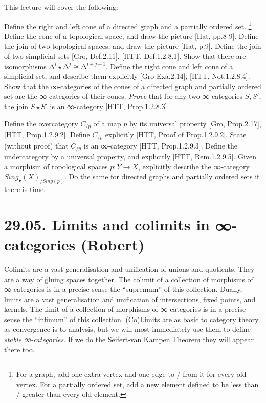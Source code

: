 \documentclass[a4paper]{amsart}
\numberwithin{figure}{section}
\theoremstyle{theorem}
\theoremstyle{definition}
\begin{document}
This lecture will cover the following: 

Define the right and left cone of a directed graph and a partially ordered set.%
\footnote{For a graph, add one extra vertex and one edge to / from it for every old vertex. For a partially ordered set, add a new element defined to be less than / greater than every old element.} %
Define the cone of a topological space, and draw the picture [Hat, pp.8-9]. %
Define the join of two topological spaces, and draw the picture [Hat, p.9]. %
Define the join of two simplicial sets [Gro, Def.2.11], [HTT, Def.1.2.8.1]. %
Show that there are isomorphisms $∆^{i} {\star} ∆^{j} \cong ∆^{i+j+1}$. %
Define the right cone and left cone of a simplicial set, and describe them explicitly [Gro Exa.2.14], [HTT, Not.1.2.8.4]. %
Show that the ∞-categories of the cones of a directed graph and partially ordered set are the ∞-categories of their cones. %
\emph{Prove} that for any two ∞-categories $S, S'$, the join $S \star S'$ is an ∞-category [HTT, Prop.1.2.8.3]. %

Define the overcategory  $C_{/p}$ of a map $p$ by its universal property [Gro, Prop.2.17], [HTT, Prop.1.2.9.2]. %
Define $C_{/p}$  explicitly [HTT, Proof of Prop.1.2.9.2]. %
State (without proof) that $C_{/p}$ is an ∞-category [HTT, Prop.1.2.9.3]. %
Define the undercategory by a universal property, and explicitly [HTT, Rem.1.2.9.5]. %
Given a morphism of topological spaces $p: Y \to X$, explicitly describe the ∞-category $Sing_\bullet(X)_{/Sing(p)}$. %
Do the same for directed graphs and partially ordered sets if there is time.



\section{29.05. Limits and colimits in ∞-categories (Robert)}

Colimits are a vast generalisation and unification of unions and quotients. They are a way of gluing spaces together. The colimit of a collection of morphisms of ∞-categories is in a precise sense the ``supremum'' of this collection. %
Dually, limits are a vast generalisation and unification of intersections, fixed points, and kernels. The limit of a collection of morphisms of ∞-categories is in a precise sense the ``infimum'' of this collection. %
(Co)Limits are as basic to category theory as convergence is to analysis, but we will most immediately use them to define \emph{stable ∞-categories}. %
If we do the Seifert-van Kampen Theorem they will appear there too.
\end{document}
